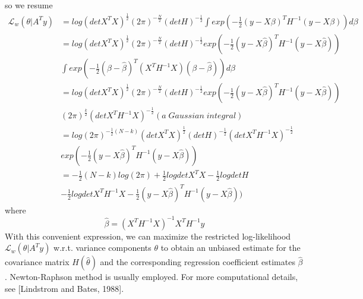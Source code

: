 \documentclass[a4paper,11pt]{article}
\begin{document}
so we resume
\begin{equation}\label{eq:3} 
  \begin{split}
 {\mathcal{L}}_w (\theta| A^T y) &= log (det X^T X)^\frac{1}{2} (2\pi)^{-\frac{N}{2}}(det H)^{-\frac{1}{2}} \int exp (-\frac{1}{2}(y - X\beta)^T H^{-1} (y - X\beta))d\beta\\
                                        &= log (det X^T X)^\frac{1}{2} (2\pi)^{-\frac{N}{2}}(det H)^{-\frac{1}{2}} exp (-\frac{1}{2}(y - X\widehat{\beta})^T H^{-1} (y - X\widehat{\beta})) \\ &\int exp(-\frac{1}{2}(\beta - \widehat{\beta} )^T(X^T H^{-1} X)(\beta - \widehat{\beta}))d\beta \\
                                        &= log (det X^T X)^\frac{1}{2} (2\pi)^{-\frac{N}{2}}(det H)^{-\frac{1}{2}} exp (-\frac{1}{2}(y - X\widehat{\beta})^T H^{-1} (y - X\widehat{\beta})) \\ &(2\pi)^{\frac{k}{2}} (det X^T H^{-1} X)^{-\frac{1}{2}} (a \;Gaussian \;integral) \\
                                        &= log(2\pi)^{-\frac{1}{2}(N-k)}(det X^T X)^{\frac{1}{2}}(det H)^{-\frac{1}{2}} (det X^T H^{-1} X)^{-\frac{1}{2}} \\ &exp (-\frac{1}{2}(y - X\widehat{\beta})^T H^{-1} (y - X\widehat{\beta})) \\
                                        &= -\frac{1}{2}(N-k) log(2\pi) + \frac{1}{2} log det X^T X - \frac{1}{2} log det H \\ &-\frac{1}{2} log det X^T H^{-1} X  -\frac{1}{2}(y - X\widehat{\beta})^T H^{-1} (y - X\widehat{\beta}))
  \end{split}
\end{equation}
where 
\begin{equation}\label{eq:4} 
         \widehat{\beta} = (X^T H^{-1} X)^{-1} X^T H^{-1} y
\end{equation}
With this convenient expression, we can maximize the restricted log-likelihood$ {\mathcal{L}}_w (\theta| A^T y)$ w.r.t. variance components $\theta$ to obtain an unbiased estimate for the covariance matrix $H(\widehat{\theta})$ and the corresponding regression coefficient estimates  $\widehat{\beta}$. Newton-Raphson method is usually employed. For more computational details, see [Lindstrom
and Bates, 1988].
\end{document}
